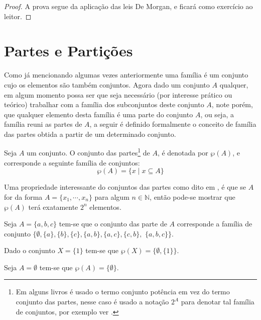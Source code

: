 \begin{proof}
	A prova segue da aplicação das leis De Morgan, e ficará como exercício ao leitor.
\end{proof}

\section{Partes e Partições}

Como já mencionando algumas vezes anteriormente uma família é um conjunto cujo os elementos são também conjuntos. Agora dado um conjunto $A$ qualquer, em algum momento possa ser que seja necessário (por interesse prático ou teórico) trabalhar com a família dos subconjuntos deste conjunto $A$, note porém, que qualquer elemento desta família é uma parte do conjunto $A$, ou seja, a família reuni as partes de $A$, a seguir é definido formalmente o conceito de família das partes obtida a partir de um determinado conjunto.

\begin{definition}\label{def:ConjuntoDasPartes}
	Seja $A$ um conjunto. O conjunto das partes\footnote{Em alguns livros é usado o termo conjunto potência em vez do termo conjunto das partes, nesse caso é usado a notação $2^A$ para denotar tal família de conjuntos, por exemplo ver \cite{lipschutz2013-MD}.} de $A$, é denotada por $\wp(A)$, e corresponde a seguinte família de conjuntos:
	$$\wp(A) = \{x \mid x \subseteq A\}$$
\end{definition}

Uma propriedade interessante do conjuntos das partes como dito em \cite{lipschutz1978-TC}, é que se $A$ for da forma $A = \{x_1, \cdots, x_n\}$ para algum $n \in \mathbb{N}$, então pode-se mostrar que $\wp(A)$ terá exatamente $2^n$ elementos.

\begin{example}
	Seja $A = \{a, b, c\}$ tem-se que o conjunto das parte de $A$ corresponde a família de conjunto $\{\emptyset, \{a\}, \{b\}, \{c\}, \{a, b\},\{a, c\}, \{c, b\},$ $\{a, b, c\}\}$.
\end{example}

\begin{example}
	Dado o conjunto $X = \{1\}$ tem-se que $\wp(X) = \{\emptyset, \{1\}\}$.
\end{example}

\begin{example}
	Seja $A = \emptyset$ tem-se que $\wp(A) = \{\emptyset\}$.
\end{example}

